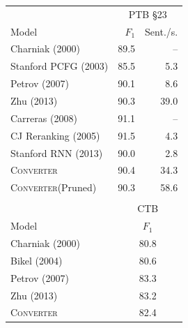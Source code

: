 \documentclass[11pt,letterpaper]{article}
\newcommand{\ParseName}{\textsc{Converter}\xspace}
\begin{document}
\begin{table}
  \centering
  \small

  \begin{tabular}{lrr}
    \toprule
    & \multicolumn{2}{c}{PTB \S 23} \\


    Model & $F_1$ & Sent./s.\\
    \midrule

    Charniak (2000)     &   89.5 &  --  \\
    Stanford PCFG (2003)     &   85.5 & 5.3  \\
    Petrov (2007)       &   90.1 & 8.6  \\
    Zhu (2013)           &   90.3 & 39.0 \\
    Carreras (2008)      &   91.1 & --    \\
    \midrule
    CJ Reranking (2005)      &   91.5 & 4.3  \\
    Stanford RNN (2013)       &   90.0 & 2.8  \\ 
    \midrule
    \ParseName        &   90.4 & 34.3 \\
    \ParseName(Pruned)        &   90.3 & 58.6 \\
    \bottomrule
    \\

    \toprule
     & \multicolumn{2}{c}{CTB} \\

    Model & \multicolumn{2}{c}{$F_1$}  \\
    \midrule
    Charniak (2000)     &   \multicolumn{2}{c}{80.8}   \\
    Bikel (2004)     &    \multicolumn{2}{c}{80.6} \\
    Petrov (2007)       &   \multicolumn{2}{c}{83.3}  \\
    Zhu (2013)           &   \multicolumn{2}{c}{83.2} \\
    \midrule
    \ParseName        &   \multicolumn{2}{c}{82.4} \\
    \bottomrule
  \end{tabular}




\end{table}
\end{document}
